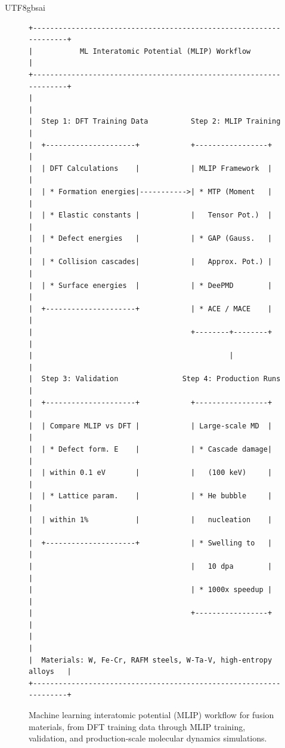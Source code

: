 \documentclass[12pt,a4paper]{article}
\begin{document}
\begin{CJK}{UTF8}{gbsai}
\begin{figure}[htbp]
\centering
\small
\begin{verbatim}
+-------------------------------------------------------------------+
|           ML Interatomic Potential (MLIP) Workflow                 |
+-------------------------------------------------------------------+
|                                                                   |
|  Step 1: DFT Training Data          Step 2: MLIP Training         |
|  +---------------------+            +-----------------+          |
|  | DFT Calculations    |            | MLIP Framework  |          |
|  | * Formation energies|----------->| * MTP (Moment   |          |
|  | * Elastic constants |            |   Tensor Pot.)  |          |
|  | * Defect energies   |            | * GAP (Gauss.   |          |
|  | * Collision cascades|            |   Approx. Pot.) |          |
|  | * Surface energies  |            | * DeePMD        |          |
|  +---------------------+            | * ACE / MACE    |          |
|                                     +--------+--------+          |
|                                              |                    |
|  Step 3: Validation               Step 4: Production Runs         |
|  +---------------------+            +-----------------+          |
|  | Compare MLIP vs DFT |            | Large-scale MD  |          |
|  | * Defect form. E    |            | * Cascade damage|          |
|  | within 0.1 eV       |            |   (100 keV)     |          |
|  | * Lattice param.    |            | * He bubble     |          |
|  | within 1%           |            |   nucleation    |          |
|  +---------------------+            | * Swelling to   |          |
|                                     |   10 dpa        |          |
|                                     | * 1000x speedup |          |
|                                     +-----------------+          |
|                                                                   |
|  Materials: W, Fe-Cr, RAFM steels, W-Ta-V, high-entropy alloys   |
+-------------------------------------------------------------------+
\end{verbatim}
\caption{Machine learning interatomic potential (MLIP) workflow for fusion materials, from DFT training data through MLIP training, validation, and production-scale molecular dynamics simulations.}
\label{fig:mlip-workflow}
\end{figure}


\end{CJK}
\end{document}
